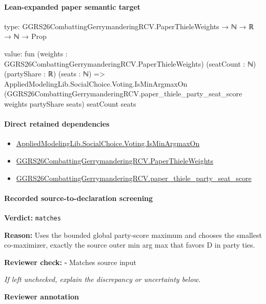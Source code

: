\documentclass[10pt]{article}
\newcommand{\reviewerbox}{%
  \par\noindent\fbox{\parbox{0.96\linewidth}{\rule{0pt}{0.38in}}}\par
}
\newcommand{\reviewmatch}[1]{%
  \par\noindent\textbf{Reviewer check:} $\square$\; #1\par
  \noindent\emph{If left unchecked, explain the discrepancy or uncertainty below.}\par
}
\begin{document}
\paragraph{Lean-expanded paper semantic target}
\begin{ReviewVerbatim}
type:
GGRS26CombattingGerrymanderingRCV.PaperThieleWeights → ℕ → ℝ → ℕ → Prop

value:
fun (weights : GGRS26CombattingGerrymanderingRCV.PaperThieleWeights) (seatCount : ℕ) (partyShare : ℝ) (seats : ℕ) =>
  AppliedModelingLib.SocialChoice.Voting.IsMinArgmaxOn
    (GGRS26CombattingGerrymanderingRCV.paper_thiele_party_seat_score weights partyShare seats) seatCount seats
\end{ReviewVerbatim}

\paragraph{Direct retained dependencies}
\begin{itemize}\raggedright
\item \hyperlink{governing-declaration-d2947cd1d156937d}{Applied\allowbreak{}Modeling\allowbreak{}Lib.\allowbreak{}Social\allowbreak{}Choice.\allowbreak{}Voting.\allowbreak{}Is\allowbreak{}Min\allowbreak{}Argmax\allowbreak{}On}
\item \hyperlink{paper-prerequisite-37b91baa3b4ddc9d}{GGRS26\allowbreak{}Combatting\allowbreak{}Gerrymandering\allowbreak{}RCV.\allowbreak{}Paper\allowbreak{}Thiele\allowbreak{}Weights}
\item \hyperlink{governing-declaration-d8487ebdee5a1786}{GGRS26\allowbreak{}Combatting\allowbreak{}Gerrymandering\allowbreak{}RCV.\allowbreak{}paper\_\allowbreak{}thiele\_\allowbreak{}party\_\allowbreak{}seat\_\allowbreak{}score}
\end{itemize}
\paragraph{Recorded source-to-declaration screening}
\textbf{Verdict:} \texttt{matches}
\\
{\raggedright
\textbf{Reason:} Uses the bounded global party-\allowbreak{}score maximum and chooses the smallest co-\allowbreak{}maximizer, exactly the source outer min arg max that favors D in party ties.\allowbreak{}
\par}
\reviewmatch{Matches source input}
\noindent\textbf{Reviewer annotation}\par
\reviewerbox
\clearpage
\hypertarget{paper-prerequisite-edccbf02c4bd6a6e}{}
\end{document}
